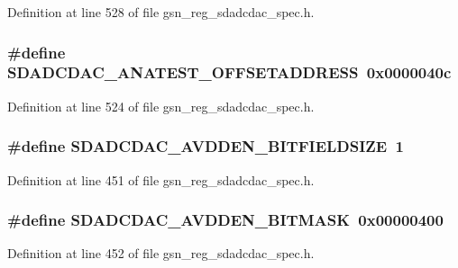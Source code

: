 Definition at line 528 of file gsn\_\-reg\_\-sdadcdac\_\-spec.h.

\hypertarget{a00569_aa9bf26509cee026f70486cebb0389ebc}{
\subsubsection[{SDADCDAC\_\-ANATEST\_\-OFFSETADDRESS}]{\setlength{\rightskip}{0pt plus 5cm}\#define SDADCDAC\_\-ANATEST\_\-OFFSETADDRESS~0x0000040c}}
\label{a00569_aa9bf26509cee026f70486cebb0389ebc}


Definition at line 524 of file gsn\_\-reg\_\-sdadcdac\_\-spec.h.

\hypertarget{a00569_a875f9810de2c7acb1747823331c46ad5}{
\subsubsection[{SDADCDAC\_\-AVDDEN\_\-BITFIELDSIZE}]{\setlength{\rightskip}{0pt plus 5cm}\#define SDADCDAC\_\-AVDDEN\_\-BITFIELDSIZE~1}}
\label{a00569_a875f9810de2c7acb1747823331c46ad5}


Definition at line 451 of file gsn\_\-reg\_\-sdadcdac\_\-spec.h.

\hypertarget{a00569_a1a0ceb95a486924228bf24773636ff1d}{
\subsubsection[{SDADCDAC\_\-AVDDEN\_\-BITMASK}]{\setlength{\rightskip}{0pt plus 5cm}\#define SDADCDAC\_\-AVDDEN\_\-BITMASK~0x00000400}}
\label{a00569_a1a0ceb95a486924228bf24773636ff1d}


Definition at line 452 of file gsn\_\-reg\_\-sdadcdac\_\-spec.h.

